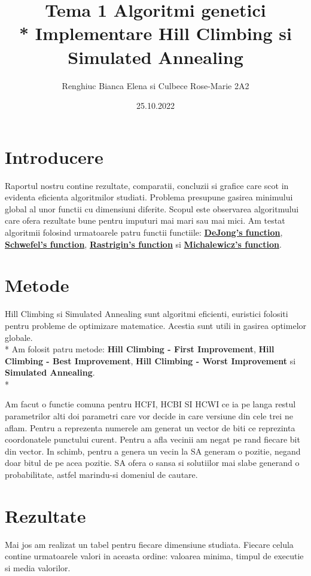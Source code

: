 \documentclass[12pt]{article}
\title{Tema 1 Algoritmi genetici \\* Implementare Hill Climbing si Simulated Annealing}
\author{Renghiuc Bianca Elena si Culbece Rose-Marie 2A2}
\date{25.10.2022}
\begin{document}
\maketitle


\section{Introducere}


Raportul nostru contine rezultate, comparatii, concluzii si grafice care scot in evidenta eficienta algoritmilor studiati. Problema presupune gasirea minimului global al unor functii cu dimensiuni diferite. Scopul este observarea algoritmului care ofera rezultate bune pentru imputuri mai mari sau mai mici. Am testat algoritmii folosind urmatoarele patru functii functiile: \href{http://www.geatbx.com/docu/fcnindex-01.html#P89_3085}{\textbf{DeJong's function}}, \href{http://www.geatbx.com/docu/fcnindex-01.html#P150_6749}{\textbf{Schwefel's function}},
\href{http://www.geatbx.com/docu/fcnindex-01.html#P140_6155}{\textbf{Rastrigin's function}} si \href{http://www.geatbx.com/docu/fcnindex-01.html#P204_10395}{\textbf{Michalewicz's function}}. 




\section{Metode}

Hill Climbing si Simulated Annealing sunt algoritmi eficienti, euristici folositi pentru probleme de optimizare matematice. Acestia sunt utili in gasirea optimelor globale. \\*
Am folosit patru metode: {\textbf{Hill Climbing - First Improvement}}, {\textbf{Hill Climbing - Best Improvement}},  {\textbf{Hill Climbing - Worst Improvement}} si {\textbf{Simulated Annealing}}. \\*

Am facut o functie comuna pentru HCFI, HCBI SI HCWI ce ia pe langa restul parametrilor alti doi parametri care vor decide in care versiune din cele trei ne aflam. Pentru a reprezenta numerele am generat un vector de biti ce reprezinta coordonatele punctului curent. Pentru a afla vecinii am negat pe rand fiecare bit din vector. In schimb, pentru a genera un vecin la SA generam o pozitie, negand doar bitul de pe acea pozitie. SA ofera o sansa si solutiilor mai slabe generand o probabilitate, astfel marindu-si domeniul de cautare.


\section{Rezultate}
Mai jos am realizat un tabel pentru fiecare dimensiune studiata. Fiecare celula contine urmatoarele valori in aceasta ordine: valoarea minima, timpul de executie si media valorilor.
\end{document}
